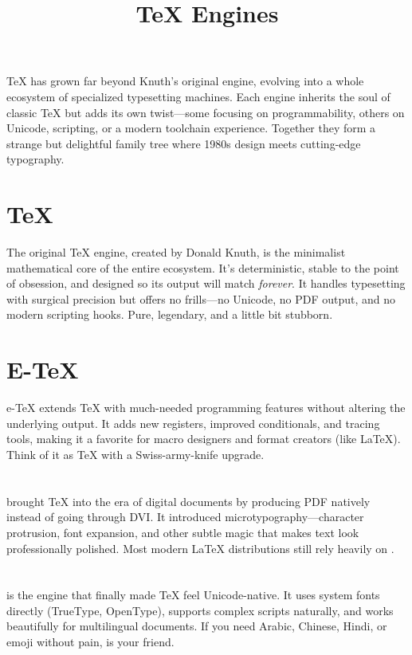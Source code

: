 \documentclass[a4paper,twoside]{article}
\title{\TeX{} Engines}
\author{}\date{}
\begin{document}
\maketitle
\TeX{} has grown far beyond Knuth's original engine, evolving into a whole ecosystem of specialized typesetting machines. Each engine inherits the soul of classic \TeX{} but adds its own twist---some focusing on programmability, others on Unicode, scripting, or a modern toolchain experience. Together they form a strange but delightful family tree where 1980s design meets cutting-edge typography.
\section{\TeX{}}
The original \TeX{} engine, created by Donald Knuth, is the minimalist mathematical core of the entire ecosystem. It's deterministic, stable to the point of obsession, and designed so its output will match \emph{forever}. It handles typesetting with surgical precision but offers no frills---no Unicode, no PDF output, and no modern scripting hooks. Pure, legendary, and a little bit stubborn.
\section{E-\TeX{}}
e-\TeX{} extends \TeX{} with much-needed programming features without altering the underlying output. It adds new registers, improved conditionals, and tracing tools, making it a favorite for macro designers and format creators (like \LaTeX{}). Think of it as \TeX{} with a Swiss-army-knife upgrade.
\section{}
 brought \TeX{} into the era of digital documents by producing PDF natively instead of going through DVI. It introduced microtypography---character protrusion, font expansion, and other subtle magic that makes text look professionally polished. Most modern \LaTeX{} distributions still rely heavily on .
\section{}
 is the engine that finally made \TeX{} feel Unicode-native. It uses system fonts directly (TrueType, OpenType), supports complex scripts naturally, and works beautifully for multilingual documents. If you need Arabic, Chinese, Hindi, or emoji without pain,  is your friend.
\end{document}
